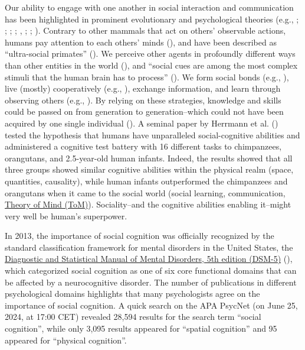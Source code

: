 \documentclass[
]{scrbook}
\begin{document}
Our ability to engage with one another in social interaction and communication has been highlighted in prominent evolutionary and psychological theories (e.g., ; ; ; ; , ; ; ). Contrary to other mammals that act on others' observable actions, humans pay attention to each others' minds (), and have been described as ``ultra-social primates'' (). We perceive other agents in profoundly different ways than other entities in the world (), and ``social cues are among the most complex stimuli that the human brain has to process'' (). We form social bonds (e.g., ), live (mostly) cooperatively (e.g., ), exchange information, and learn through observing others (e.g., ). By relying on these strategies, knowledge and skills could be passed on from generation to generation\thinspace --\thinspace which could not have been acquired by one single individual (). A seminal paper by Herrmann et al. () tested the hypothesis that humans have unparalleled social-cognitive abilities and administered a cognitive test battery with 16 different tasks to chimpanzees, orangutans, and 2.5-year-old human infants. Indeed, the results showed that all three groups showed similar cognitive abilities within the physical realm (space, quantities, causality), while human infants outperformed the chimpanzees and orangutans when it came to the social world (social learning, communication, \hyperref[acronyms_ToM]{Theory of Mind (ToM)}). Sociality\thinspace --\thinspace and the cognitive abilities enabling it\thinspace --\thinspace might very well be human's superpower.

In 2013, the importance of social cognition was officially recognized by the standard classification framework for mental disorders in the United States, the \hyperref[acronyms_DSM-5]{Diagnostic and Statistical Manual of Mental Disorders, 5th edition (DSM-5)} (), which categorized social cognition as one of six core functional domains that can be affected by a neurocognitive disorder. The number of publications in different psychological domains highlights that many psychologists agree on the importance of social cognition. A quick search on the APA PsycNet (on June 25, 2024, at 17:00 CET) revealed 28,594 results for the search term ``social cognition'', while only 3,095 results appeared for ``spatial cognition'' and 95 appeared for ``physical cognition''.
\end{document}
